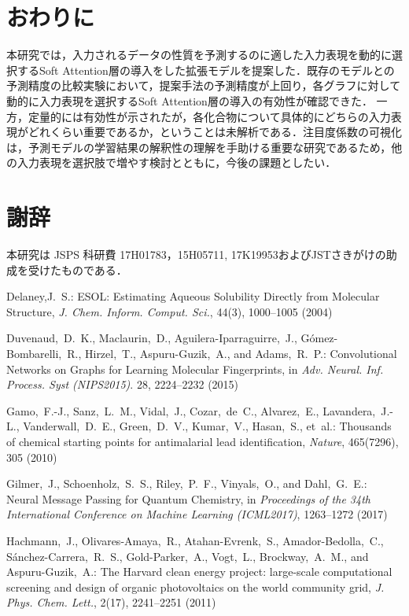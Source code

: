 \documentclass[twocolumn]{jarticle}
\begin{document}
\vspace{-11pt}
\section{おわりに}
本研究では，入力されるデータの性質を予測するのに適した入力表現を動的に選択するSoft Attention層の導入をした拡張モデルを提案した．既存のモデルとの予測精度の比較実験において，提案手法の予測精度が上回り，各グラフに対して動的に入力表現を選択するSoft Attention層の導入の有効性が確認できた．
一方，定量的には有効性が示されたが，各化合物について具体的にどちらの入力表現がどれくらい重要であるか，ということは未解析である．注目度係数の可視化は，予測モデルの学習結果の解釈性の理解を手助ける重要な研究であるため，他の入力表現を選択肢で増やす検討とともに，今後の課題としたい．

\vspace{-13pt}
\section*{謝辞}
本研究は JSPS 科研費 17H01783，15H05711, 17K19953およびJSTさきがけの助成を受けたものである．

\begin{spacing}{0.1}
\footnotesize
\begin{thebibliography}{}

Delaney,J.~S.: ESOL: Estimating Aqueous Solubility Directly
  from Molecular Structure, {\em J. Chem. Inform. Comput. Sci.}, 44(3), 1000--1005 (2004)

Duvenaud,~D.~K., Maclaurin,~D., Aguilera{-}Iparraguirre,~J.,
  G{\'{o}}mez{-}Bombarelli,~R., Hirzel,~T., Aspuru{-}Guzik,~A., and
  Adams,~R.~P.: Convolutional Networks on Graphs for Learning Molecular
  Fingerprints, in {\em Adv. Neural. Inf. Process. Syst (NIPS2015)}. 28, 2224--2232 (2015)

Gamo,~F.-J., Sanz,~L.~M., Vidal,~J., Cozar,~de~C.,
  Alvarez,~E., Lavandera,~J.-L., Vanderwall,~D.~E., Green,~D.~V., Kumar,~V.,
  Hasan,~S., et~al.: Thousands of chemical starting points for antimalarial
  lead identification, {\em Nature}, 465(7296), 305 (2010)

Gilmer,~J., Schoenholz,~S.~S., Riley,~P.~F., Vinyals,~O., and
  Dahl,~G.~E.: Neural Message Passing for Quantum Chemistry, in {\em
  Proceedings of the 34th International Conference on Machine Learning ({ICML}2017)}, 1263--1272 (2017)

Hachmann,~J., Olivares-Amaya,~R., Atahan-Evrenk,~S.,
  Amador-Bedolla,~C., S{\'a}nchez-Carrera,~R.~S., Gold-Parker,~A., Vogt,~L.,
  Brockway,~A.~M., and Aspuru-Guzik,~A.: The Harvard clean energy project:
  large-scale computational screening and design of organic photovoltaics on
  the world community grid, {\em J. Phys. Chem. Lett.},
  2(17), 2241--2251 (2011)

\end{thebibliography}

\end{spacing} 
\end{document}
